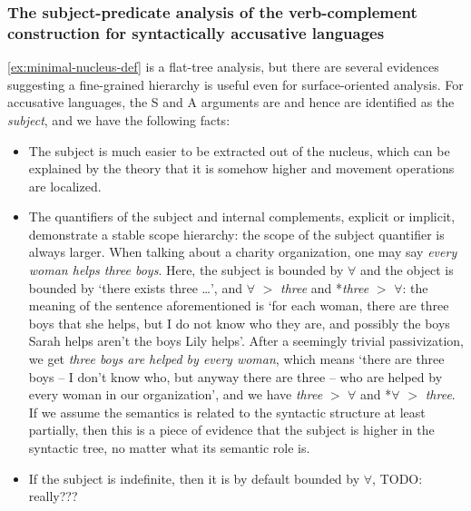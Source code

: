 \documentclass[UTF8, a4paper, oneside, scheme=plain]{ctexart}
\newcommand*{\term}[1]{\emph{#1}}
\newcommand*{\corpus}[1]{\emph{#1}}
\begin{document}
\subsubsection{The subject-predicate analysis of the verb-complement construction for syntactically accusative languages}

\eqref{ex:minimal-nucleus-def} is a flat-tree analysis, 
but there are several evidences suggesting 
a fine-grained hierarchy is useful even for surface-oriented analysis.
For accusative languages, 
the S and A arguments are and hence are identified as the \term{subject}, 
and we have the following facts:
\begin{itemize}
    \item The subject is much easier to be extracted out of the nucleus,
    which can be explained by the theory that 
    it is somehow higher and movement operations are localized.
    \item The quantifiers of the subject and internal complements, 
    explicit or implicit, 
    demonstrate a stable scope hierarchy:
    the scope of the subject quantifier is always larger.
    When talking about a charity organization,
    one may say \corpus{every woman helps three boys}.
    Here, the subject is bounded by $\forall$ and the object is bounded by `there exists three \dots',
    and $\forall$ $>$ \corpus{three} and *\corpus{three} $>$ $\forall$:
    the meaning of the sentence aforementioned is 
    `for each woman, there are three boys that she helps,
    but I do not know who they are,
    and possibly the boys Sarah helps aren't the boys Lily helps'.
    After a seemingly trivial passivization, 
    we get \corpus{three boys are helped by every woman},
    which means 
    `there are three boys -- I don't know who, but anyway there are three -- 
    who are helped by every woman in our organization',
    and we have \corpus{three} $>$ $\forall$ and *$\forall$ $>$ \corpus{three}.
    If we assume the semantics is related to the syntactic structure at least partially,
    then this is a piece of evidence that the subject is higher in the syntactic tree,
    no matter what its semantic role is. 
    \item If the subject is indefinite, then it is by default bounded by $\forall$, TODO: really???
    

\end{itemize}
\end{document}
